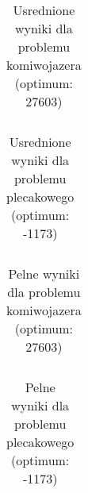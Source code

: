 \documentclass{article}
\begin{document}
\begin{longtable}{|ll|ll|}
\caption{Usrednione wyniki dla problemu komiwojazera (optimum: 27603)} \\
\hline

\hline
\end{longtable}

\clearpage

\begin{longtable}{|ll|ll|}
\caption{Usrednione wyniki dla problemu plecakowego (optimum: -1173)} \\
\hline

\hline
\end{longtable}

\clearpage

\begin{longtable}{|lll|ll|}
\caption{Pelne wyniki dla problemu komiwojazera (optimum: 27603)} \\
\hline

\hline
\end{longtable}

\clearpage

\begin{longtable}{|lll|ll|}
\caption{Pelne wyniki dla problemu plecakowego (optimum: -1173)} \\
\hline

\hline
\end{longtable}
\end{document}
